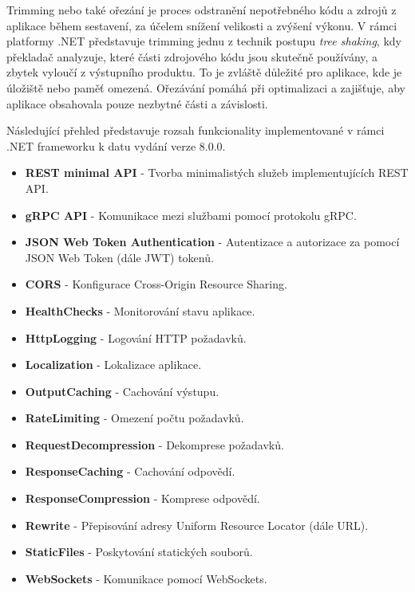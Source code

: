 Trimming nebo také ořezání je proces odstranění nepotřebného kódu a zdrojů z aplikace během sestavení, za účelem snížení velikosti a zvýšení výkonu. V rámci platformy .NET představuje trimming jednu z technik postupu \emph{tree shaking}, kdy překladač analyzuje, které části zdrojového kódu jsou skutečně používány, a zbytek vyloučí z výstupního produktu. \cite{Price2023c8} To je zvláště důležité pro aplikace, kde je úložiště nebo paměť omezená. Ořezávání pomáhá při optimalizaci a zajišťuje, aby aplikace obsahovala pouze nezbytné části a závislosti. 


Následující přehled představuje rozsah funkcionality implementované v rámci .NET frameworku k datu vydání verze 8.0.0. \cite{aspnetdocs}

\begin{itemize}
    \item \textbf{REST minimal API} - Tvorba minimalistých služeb implementujících REST API.
    \item \textbf{gRPC API} - Komunikace mezi službami pomocí protokolu gRPC.
    \item \textbf{JSON Web Token Authentication} - Autentizace a autorizace za pomocí JSON Web Token (dále JWT) tokenů.
    \item \textbf{CORS} - Konfigurace Cross-Origin Resource Sharing.
    \item \textbf{HealthChecks} - Monitorování stavu aplikace.
    \item \textbf{HttpLogging} - Logování HTTP požadavků.
    \item \textbf{Localization} - Lokalizace aplikace.
    \item \textbf{OutputCaching} - Cachování výstupu.
    \item \textbf{RateLimiting} - Omezení počtu požadavků.
    \item \textbf{RequestDecompression} - Dekomprese požadavků.
    \item \textbf{ResponseCaching} - Cachování odpovědí.
    \item \textbf{ResponseCompression} - Komprese odpovědí.
    \item \textbf{Rewrite} - Přepisování adresy Uniform Resource Locator (dále URL).
    \item \textbf{StaticFiles} - Poskytování statických souborů.
    \item \textbf{WebSockets} - Komunikace pomocí WebSockets.
\end{itemize}
